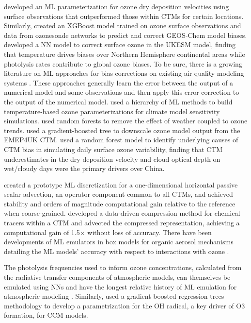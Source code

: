 \documentclass[gmd, manuscript]{copernicus}
\begin{document}
\citet{silva_deep_2019} developed an ML parameterization for ozone dry deposition velocities using surface observations that outperformed those within CTMs for certain locations. Similarly, \citet{ivatt_improving_2020} created an XGBoost model trained on ozone surface observations and data from ozonesonde networks to predict and correct GEOS-Chem model biases. \citet{liu_correcting_2022} developed a NN model to correct surface ozone in the UKESM model, finding that temperature drives biases over Northern Hemisphere continental areas while photolysis rates contribute to global ozone biases. To be sure, there is a growing literature on ML approaches for bias corrections on existing air quality modeling systems \citep{Neal2014, Borrego2011, Silibello2015}. These approaches generally learn the error between the output of a numerical model and some observations and then apply this error correction to the output of the numerical model. \citet{nowack_using_2018} used a hierarchy of ML methods to build temperature-based ozone parameterizations for climate model sensitivity simulations. \citet{colombi_why_2023} used random forests to remove the effect of weather coupled to ozone trends. \citet{Gouldsbrough2024} used a gradient-boosted tree to downscale ozone model output from the EMEP4UK CTM. \citet{ye_diagnosing_2022} used a random forest model to identify underlying causes of CTM bias in simulating daily surface ozone variability, finding that CTM underestimates in the dry deposition velocity and cloud optical depth on wet/cloudy days were the primary drivers over China. 
 
\citet{park_learned_2023} created a prototype ML discretization for a one-dimensional horizontal passive scalar advection, an operator component common to all CTMs, and achieved stability and orders of magnitude computational gain relative to the reference when coarse-grained. \citet{sturm_advecting_2023} developed a data-driven compression method for chemical tracers within a CTM and advected the compressed representation, achieving a computational gain of 1.5$\times$ without loss of accuracy. There have been developments of ML emulators in box models for organic aerosol mechanisms detailing the ML models’ accuracy with respect to interactions with ozone \citep{mouchel-vallon_toward_2023, schreck_neural_2022}.
 
The photolysis frequencies used to inform ozone concentrations, calculated from the radiative transfer components of atmospheric models, can themselves be emulated using NNs \citep{lagerquist_using_2021} and have the longest relative history of ML emulation for atmospheric modeling \citep{krasnopolsky_new_2005,krasnopolsky_decadal_2008}. Similarly, \citet{anderson_machine_2022} used a gradient-boosted regression trees methodology to develop a parametrization for the OH radical, a key driver of O3 formation, for CCM models. 
\end{document}

